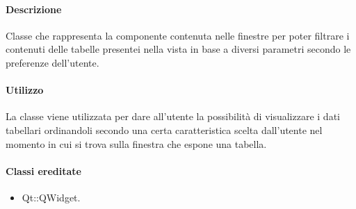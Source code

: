 \paragraph{Descrizione \\}
Classe che rappresenta la componente contenuta nelle finestre per poter filtrare i contenuti delle tabelle presentei nella vista in base a diversi parametri secondo le preferenze dell'utente.
\paragraph{Utilizzo\\}
La classe viene utilizzata per dare all'utente la possibilità di visualizzare i dati tabellari ordinandoli secondo una certa caratteristica scelta dall'utente nel momento in cui si trova sulla finestra che espone una tabella.
\paragraph{Classi ereditate\\}
\begin{itemize}
\item Qt::QWidget.
\end{itemize}
